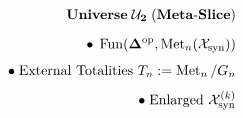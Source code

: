 \documentclass[preview]{standalone}
\begin{document}
\begin{align*}
\special{dvisvgm:raw <g id='unique000'>}\mathbf{Universe\;\mathcal{U}_2\;(Meta\text{-}Slice)}\\[6pt]\bullet\;\operatorname{Fun}(\mathbf{\Delta}^{\text{op}}, \operatorname{Met}_n(\mathcal{X}_{\text{syn}}))\\[4pt]\bullet\;\text{External Totalities }T_n := \operatorname{Met}_n/G_n\\[4pt]\bullet\;\text{Enlarged }\mathcal{X}_{\text{syn}}^{(k)}\special{dvisvgm:raw </g>}
\end{align*}
\end{document}
